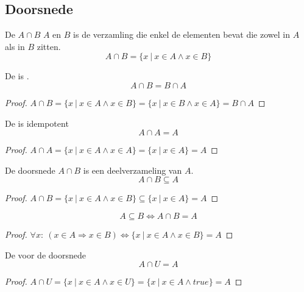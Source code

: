 \documentclass[main.tex]{subfiles}
\begin{document}
\subsection{Doorsnede}
\label{sec:doorsnede}

\begin{de}
  De  $A \cap B$  $A$ en $B$ is de verzamling die enkel de elementen bevat die zowel in $A$ als in $B$ zitten.
  \[ A \cap B = \{ x\ |\ x \in A \wedge x \in B\} \]
\end{de}

\begin{ei}
  De  is .
  \[ A \cap B = B \cap A \]
  \begin{proof}
    $A \cap B = \{ x\ |\ x \in A \wedge x \in B\} = \{ x\ |\ x \in B \wedge x \in A\} = B \cap A$
  \end{proof}
\end{ei}

\begin{ei}
  De  is idempotent
  \[ A \cap A = A \]
  \begin{proof}
    $A \cap A = \{ x\ |\ x \in A \wedge x \in A\} = \{ x\ |\ x \in A \} = A$
  \end{proof}
\end{ei} 

\begin{st}
  De doorsnede $A \cap B$ is een deelverzameling van $A$.
  \[ A \cap B \subseteq A \]
  \begin{proof}
    $A \cap B = \{ x\ |\ x \in A \wedge x \in B \} \subseteq \{ x\ |\ x \in A \} = A  $
  \end{proof}
\end{st}

\begin{st}
  \[ A \subseteq B \Leftrightarrow A \cap B = A \]
  \begin{proof}
    $\forall x:\ (x\in A \Rightarrow x \in B) \Leftrightarrow \{ x\ |\ x \in A \wedge x \in B \} = A$
  \end{proof}
\end{st}

\begin{st}
  De  voor de doorsnede
  \[ A \cap U = A \]
  \begin{proof}
    $A \cap U = \{ x\ |\ x \in A \wedge x \in U\} = \{ x\ |\ x \in A \wedge true \} = A$
  \end{proof}
\end{st}
\end{document}
